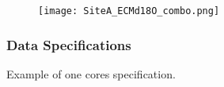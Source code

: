 \documentclass[../../CompleteThesis2/Complete_2ndDraft]{subfiles}
\begin{document}
\begin{figure}[h]
	\centering
	\texttt{[image: SiteA\_ECMd18O\_combo.png]}
	\caption[]{}
	\label{fig:SiteA_ECMd18O_combo}
\end{figure}

\subsubsection[Data Specifications][Data Specifications]{Data Specifications}
\label{Subsubsec:Data_Selection_Alhabet_Specifications}
Example of one cores specification. 
\end{document}
